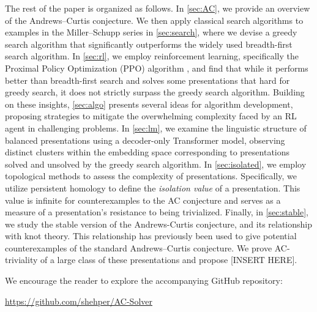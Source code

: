 \medskip The rest of the paper is organized as follows. In \cref{sec:AC}, we provide an overview of the Andrews--Curtis conjecture. We then apply classical search algorithms to examples in the Miller--Schupp series in \cref{sec:search}, where we devise a greedy search algorithm that significantly outperforms the widely used breadth-first search algorithm. In \cref{sec:rl}, we employ reinforcement learning, specifically the Proximal Policy Optimization (PPO) algorithm \cite{schulman2017proximal}, and find that while it performs better than breadth-first search and solves some presentations that hard for greedy search, it does not strictly surpass the greedy search algorithm.
Building on these insights, \cref{sec:algo} presents several ideas for algorithm development, proposing strategies to mitigate the overwhelming complexity faced by an RL agent in challenging problems.
In \cref{sec:lm}, we examine the linguistic structure of balanced presentations using a decoder-only Transformer model, observing distinct clusters within the embedding space corresponding to presentations solved and unsolved by the greedy search algorithm.
In \cref{sec:isolated}, we employ topological methods to assess the complexity of presentations. Specifically, we utilize persistent homology to define the \textit{isolation value} of a presentation. This value is infinite for counterexamples to the AC conjecture and serves as a measure of a presentation's resistance to being trivialized. Finally, in \cref{sec:stable}, we study the stable version of the Andrews-Curtis conjecture, and its relationship with knot theory.
This relationship has previously been used to give potential counterexamples of the standard Andrews--Curtis conjecture. We prove AC-triviality of a large class of these presentations and propose [INSERT HERE]. 

\medskip\noindent
We encourage the reader to explore the accompanying GitHub repository:
\begin{center}
	\href{https://github.com/shehper/AC-Solver}{https://github.com/shehper/AC-Solver}
\end{center}